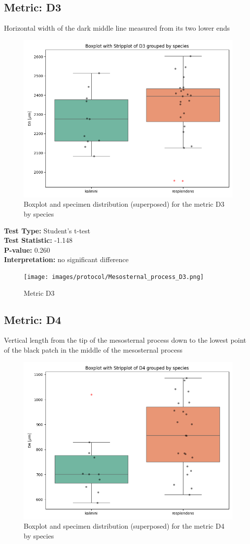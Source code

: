 \newpage
\subsection*{Metric: D3}

Horizontal width of the dark middle line measured from its two lower ends

\begin{figure}[H]
\centering
\includegraphics[width=0.7\linewidth]{images/boxplot/boxplot_D3.png}
\caption{  Boxplot and specimen distribution (superposed) for the metric  D3 by species}
\end{figure}

\noindent\textbf{Test Type:} Student's t-test \\
\noindent\textbf{Test Statistic:} -1.148 \\
\noindent\textbf{P-value:} 0.260 \\
\noindent\textbf{Interpretation:} no significant difference

\begin{figure}[H]
\centering
\texttt{[image: images/protocol/Mesosternal\_process\_D3.png]}
\caption{ Metric D3}
\end{figure}

\newpage
\subsection*{Metric: D4}

Vertical length from the tip of the mesosternal process down to the lowest point of the black patch in the middle of the mesosternal process

\begin{figure}[H]
\centering
\includegraphics[width=0.7\linewidth]{images/boxplot/boxplot_D4.png}
\caption{  Boxplot and specimen distribution (superposed) for the metric  D4 by species}
\end{figure}

